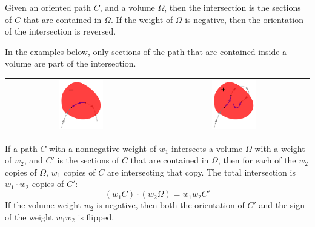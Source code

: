 \documentclass{book}
\begin{document}
Given an oriented path \(C\), and a volume \(\Omega\), then the intersection is the sections of \(C\) that are contained in \(\Omega\). If the weight of \(\Omega\) is negative, then the orientation of the intersection is reversed. %

In the examples below, only sections of the path that are contained inside a volume are part of the intersection.

\begin{center}
\begin{tabular}{cc}
\includegraphics[width = 0.3\textwidth]{Intersections/Path-volume_intersections/path_volume_intersections_example}
& 
\includegraphics[width = 0.3\textwidth]{Intersections/Path-volume_intersections/path_volume_intersections_example_2}
\end{tabular}
\end{center}

If a path \(C\) with a nonnegative weight of \(w_1\) intersects a volume \(\Omega\) with a weight of \(w_2\), and \(C'\) is the sections of \(C\) that are contained in \(\Omega\), then for each of the \(w_2\) copies of \(\Omega\), \(w_1\) copies of \(C\) are intersecting that copy. The total intersection is \(w_1 \cdot w_2\) copies of \(C'\):
\[(w_1 C) \cdot (w_2 \Omega) = w_1 w_2 C'\] 
If the volume weight \(w_2\) is negative, then both the orientation of \(C'\) and the sign of the weight \(w_1 w_2\) is flipped. 
\end{document}
